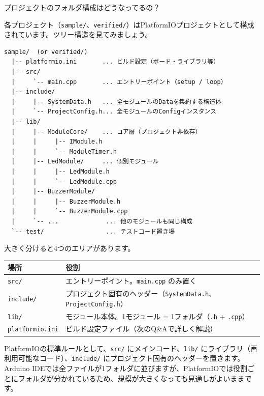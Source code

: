 \begin{qabox}{プロジェクトのフォルダ構成はどうなってるの？}

各プロジェクト（\texttt{sample/}、\texttt{verified/}）はPlatformIOプロジェクトとして構成されています。ツリー構造を見てみましょう。

\begin{lstlisting}[language={},keywordstyle={},commentstyle={},stringstyle={},numbers=none,frame=none,backgroundcolor=\color{lightgray},xleftmargin=5pt,framexleftmargin=5pt]
sample/  (or verified/)
  |-- platformio.ini       ... ビルド設定（ボード・ライブラリ等）
  |-- src/
  |     `-- main.cpp       ... エントリーポイント（setup / loop）
  |-- include/
  |     |-- SystemData.h   ... 全モジュールのDataを集約する構造体
  |     `-- ProjectConfig.h... 全モジュールのConfigインスタンス
  |-- lib/
  |     |-- ModuleCore/    ... コア層（プロジェクト非依存）
  |     |     |-- IModule.h
  |     |     `-- ModuleTimer.h
  |     |-- LedModule/     ... 個別モジュール
  |     |     |-- LedModule.h
  |     |     `-- LedModule.cpp
  |     |-- BuzzerModule/
  |     |     |-- BuzzerModule.h
  |     |     `-- BuzzerModule.cpp
  |     `-- ...             ... 他のモジュールも同じ構成
  `-- test/                 ... テストコード置き場
\end{lstlisting}

大きく分けると4つのエリアがあります。

\vspace{2mm}
\begin{tabularx}{\textwidth}{l X}
\toprule
\textbf{場所} & \textbf{役割} \\
\midrule
\texttt{src/} & エントリーポイント。\texttt{main.cpp} のみ置く \\
\texttt{include/} & プロジェクト固有のヘッダー（\texttt{SystemData.h}、\texttt{ProjectConfig.h}） \\
\texttt{lib/} & モジュール本体。1モジュール = 1フォルダ（\texttt{.h} + \texttt{.cpp}） \\
\texttt{platformio.ini} & ビルド設定ファイル（次のQ\&Aで詳しく解説） \\
\bottomrule
\end{tabularx}

\begin{notebox}[なぜこの構成なの？]
PlatformIOの標準ルールとして、\texttt{src/} にメインコード、\texttt{lib/} にライブラリ（再利用可能なコード）、\texttt{include/} にプロジェクト固有のヘッダーを置きます。Arduino IDEでは全ファイルが1フォルダに並びますが、PlatformIOでは役割ごとにフォルダが分かれているため、規模が大きくなっても見通しがよいままです。
\end{notebox}

\end{qabox}

